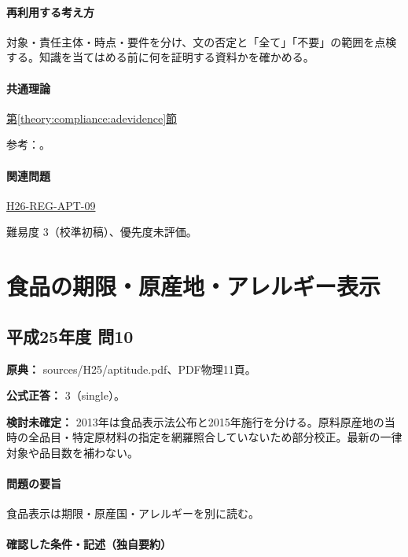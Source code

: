 \paragraph{再利用する考え方} 対象・責任主体・時点・要件を分け、文の否定と「全て」「不要」の範囲を点検する。知識を当てはめる前に何を証明する資料かを確かめる。

\paragraph{共通理論} \hyperref[theory:compliance:adevidence]{第\ref*{theory:compliance:adevidence}節}

\par 参考：\cite{saf53_ad2016}。

\paragraph{関連問題} \hyperref[q:h26-reg-apt-09]{H26-REG-APT-09}

\par 難易度 3（校準初稿）、優先度未評価。

\section{食品の期限・原産地・アレルギー表示}

\subsection{平成25年度 問10}
\label{q:h25-reg-apt-10}

\noindent\textbf{原典：} sources/H25/aptitude.pdf、PDF物理11頁。

\textbf{公式正答：} 3（single）。

\par\textbf{検討未確定：} 2013年は食品表示法公布と2015年施行を分ける。原料原産地の当時の全品目・特定原材料の指定を網羅照合していないため部分校正。最新の一律対象や品目数を補わない。

\paragraph{問題の要旨} 食品表示は期限・原産国・アレルギーを別に読む。

\paragraph{確認した条件・記述（独自要約）}\mbox{}\par

